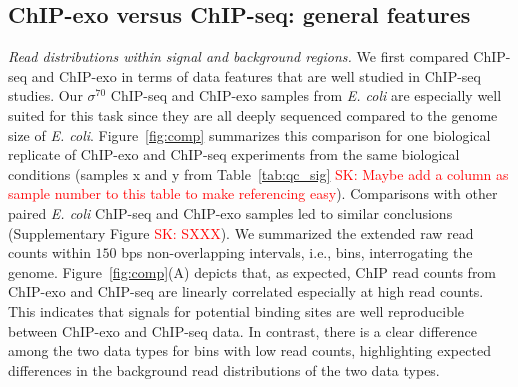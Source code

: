 \documentclass{bmcart}
\newcommand{\SK}[1]{\textcolor{red}{SK: #1}}
\newcommand{\sig}{\sigma^{70}}
\begin{document}
\subsection*{ChIP-exo versus ChIP-seq: general features}

\textit{Read distributions within signal and background regions.}
We first compared ChIP-seq and ChIP-exo in terms of data features that are well studied in ChIP-seq studies.
Our $\sig$  ChIP-seq and ChIP-exo samples from \textit{E. coli} are especially well suited for this task since they are all deeply sequenced compared to the genome size of \textit{E. coli}.   Figure~\ref{fig:comp} summarizes this comparison for one biological replicate  of ChIP-exo and ChIP-seq experiments from the same biological conditions (samples x and y from Table~\ref{tab:qc_sig} \SK{Maybe add a column as sample number to this table to make referencing easy}). Comparisons with other paired \textit{E. coli} ChIP-seq and ChIP-exo  samples led to similar conclusions (Supplementary Figure \SK{SXXX}).
We summarized the extended raw read counts within $150$ bps non-overlapping intervals, i.e., bins, interrogating the genome.
Figure~\ref{fig:comp}(A) depicts that, as expected,  ChIP read counts from ChIP-exo and ChIP-seq are linearly 
correlated especially at high read counts. This indicates that signals for potential binding
sites are well reproducible between ChIP-exo and ChIP-seq data. 
In contrast, there is a clear difference
among the two data types for bins with low read counts, highlighting expected differences in the  background read distributions 
of the two data types. 
\end{document}
